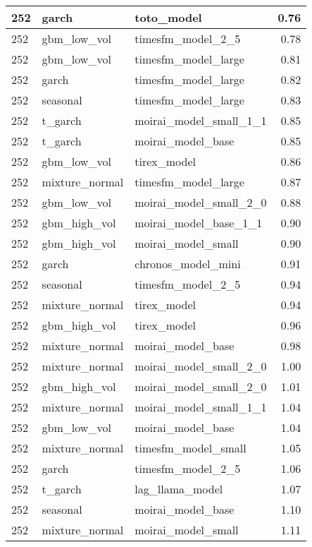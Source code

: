 {\begin{tabular}{lllr}
\midrule
252 & garch & toto\_model & 0.76 \\
\midrule
252 & gbm\_low\_vol & timesfm\_model\_2\_5 & 0.78 \\
\midrule
252 & gbm\_low\_vol & timesfm\_model\_large & 0.81 \\
\midrule
252 & garch & timesfm\_model\_large & 0.82 \\
\midrule
252 & seasonal & timesfm\_model\_large & 0.83 \\
\midrule
252 & t\_garch & moirai\_model\_small\_1\_1 & 0.85 \\
\midrule
252 & t\_garch & moirai\_model\_base & 0.85 \\
\midrule
252 & gbm\_low\_vol & tirex\_model & 0.86 \\
\midrule
252 & mixture\_normal & timesfm\_model\_large & 0.87 \\
\midrule
252 & gbm\_low\_vol & moirai\_model\_small\_2\_0 & 0.88 \\
\midrule
252 & gbm\_high\_vol & moirai\_model\_base\_1\_1 & 0.90 \\
\midrule
252 & gbm\_high\_vol & moirai\_model\_small & 0.90 \\
\midrule
252 & garch & chronos\_model\_mini & 0.91 \\
\midrule
252 & seasonal & timesfm\_model\_2\_5 & 0.94 \\
\midrule
252 & mixture\_normal & tirex\_model & 0.94 \\
\midrule
252 & gbm\_high\_vol & tirex\_model & 0.96 \\
\midrule
252 & mixture\_normal & moirai\_model\_base & 0.98 \\
\midrule
252 & mixture\_normal & moirai\_model\_small\_2\_0 & 1.00 \\
\midrule
252 & gbm\_high\_vol & moirai\_model\_small\_2\_0 & 1.01 \\
\midrule
252 & mixture\_normal & moirai\_model\_small\_1\_1 & 1.04 \\
\midrule
252 & gbm\_low\_vol & moirai\_model\_base & 1.04 \\
\midrule
252 & mixture\_normal & timesfm\_model\_small & 1.05 \\
\midrule
252 & garch & timesfm\_model\_2\_5 & 1.06 \\
\midrule
252 & t\_garch & lag\_llama\_model & 1.07 \\
\midrule
252 & seasonal & moirai\_model\_base & 1.10 \\
\midrule
252 & mixture\_normal & moirai\_model\_small & 1.11 \\

\end{tabular}}
